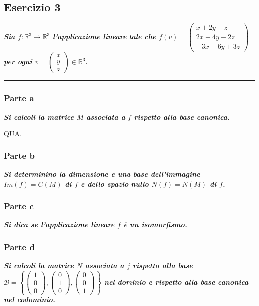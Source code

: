 \documentclass[a4paper]{article}
\newcommand{\longline}{\noindent\rule{\textwidth}{0.4pt}}
\begin{document}
	\subsection{Esercizio 3}

	\textcolor{Green4}{\textbf{\emph{Sia $f: \mathbb{R}^{3} \rightarrow \mathbb{R}^{3}$ l'applicazione lineare tale che $f\left(v\right) = \begin{pmatrix}
		x+2y-z \\
		2x+4y-2z \\
		-3x-6y+3z
	\end{pmatrix}$ per ogni $v=\begin{pmatrix}
		x \\ y \\ z
	\end{pmatrix} \in \mathbb{R}^{3}$.}}}

	\longline

	\subsubsection{Parte a}

	\textcolor{Green4}{\textbf{\emph{Si calcoli la matrice $M$ associata a $f$ rispetto alla base canonica.}}}\newline

	\noindent
	QUA.

	\subsubsection{Parte b}

	\textcolor{Green4}{\textbf{\emph{Si determinino la dimensione e una base dell'immagine $Im\left(f\right) = C\left(M\right)$ di $f$ e dello spazio nullo $N\left(f\right) = N\left(M\right)$ di $f$.}}}

	\subsubsection{Parte c}

	\textcolor{Green4}{\textbf{\emph{Si dica se l'applicazione lineare $f$ è un isomorfismo.}}}

	\subsubsection{Parte d}

	\textcolor{Green4}{\textbf{\emph{Si calcoli la matrice $N$ associata a $f$ rispetto alla base $\mathcal{B} = \left\{\begin{pmatrix}
		1 \\ 0 \\ 0
	\end{pmatrix},\begin{pmatrix}
		0 \\ 1 \\ 0
	\end{pmatrix},\begin{pmatrix}
		0 \\ 0 \\ 1
	\end{pmatrix}\right\}$ nel dominio e rispetto alla base canonica nel codominio.}}}
\end{document}
